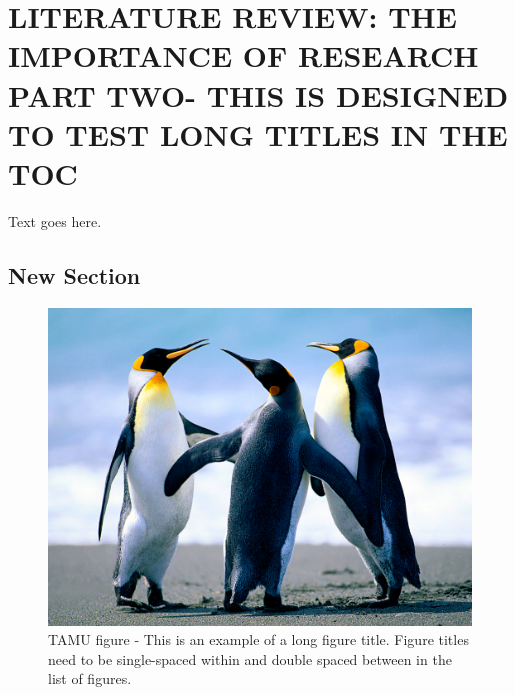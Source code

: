 %
%
%


\chapter{\uppercase {Literature Review: The Importance of Research Part Two- This is designed to test long titles in the TOC}}

Text goes here.

\section{New Section}
\begin{figure}[H]
\centering
\includegraphics[scale=.50]{Penguins.jpg}
\caption{TAMU figure - This is an example of a long figure title.  Figure titles need to be single-spaced within and double spaced between in the list of figures.}
\label{fig:landscapepenguins}
\end{figure}
